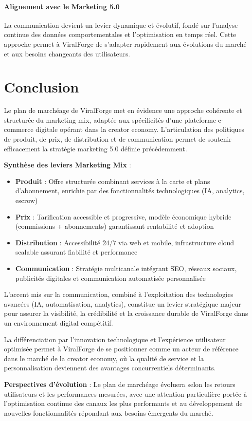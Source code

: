 \paragraph{Alignement avec le Marketing 5.0}

La communication devient un levier dynamique et évolutif, fondé sur l'analyse continue des données comportementales et l'optimisation en temps réel. Cette approche permet à ViralForge de s'adapter rapidement aux évolutions du marché et aux besoins changeants des utilisateurs.

\newpage

\section*{Conclusion}

Le plan de marchéage de ViralForge met en évidence une approche cohérente et structurée du marketing mix, adaptée aux spécificités d'une plateforme e-commerce digitale opérant dans la creator economy. L'articulation des politiques de produit, de prix, de distribution et de communication permet de soutenir efficacement la stratégie marketing 5.0 définie précédemment.

\textbf{Synthèse des leviers Marketing Mix} :

\begin{itemize}
    \item \textbf{Produit} : Offre structurée combinant services à la carte et plans d'abonnement, enrichie par des fonctionnalités technologiques (IA, analytics, escrow)
    \item \textbf{Prix} : Tarification accessible et progressive, modèle économique hybride (commissions + abonnements) garantissant rentabilité et adoption
    \item \textbf{Distribution} : Accessibilité 24/7 via web et mobile, infrastructure cloud scalable assurant fiabilité et performance
    \item \textbf{Communication} : Stratégie multicanale intégrant SEO, réseaux sociaux, publicités digitales et communication automatisée personnalisée
\end{itemize}

L'accent mis sur la communication, combiné à l'exploitation des technologies avancées (IA, automatisation, analytics), constitue un levier stratégique majeur pour assurer la visibilité, la crédibilité et la croissance durable de ViralForge dans un environnement digital compétitif.

La différenciation par l'innovation technologique et l'expérience utilisateur optimisée permet à ViralForge de se positionner comme un acteur de référence dans le marché de la creator economy, où la qualité de service et la personnalisation deviennent des avantages concurrentiels déterminants.

\vspace{0.5cm}

\textbf{Perspectives d'évolution} : Le plan de marchéage évoluera selon les retours utilisateurs et les performances mesurées, avec une attention particulière portée à l'optimisation continue des canaux les plus performants et au développement de nouvelles fonctionnalités répondant aux besoins émergents du marché.

